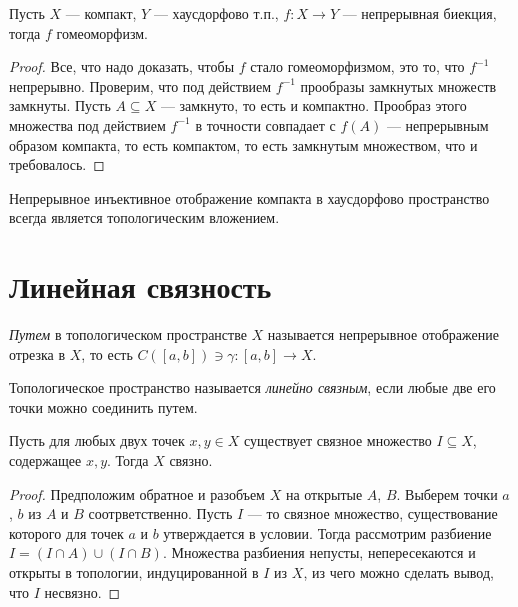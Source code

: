 \begin{theorem}
	Пусть $X$ --- компакт, $Y$ --- хаусдорфово т.п., $f \colon X \to Y$ ---
	непрерывная биекция, тогда $f$ гомеоморфизм.
\end{theorem}
\begin{proof}
	Все, что надо доказать, чтобы $f$ стало гомеоморфизмом, это то, что $f^{-1}$
	непрерывно. Проверим, что под действием $f^{-1}$ прообразы замкнутых множеств
	замкнуты. Пусть $A \subseteq X$ --- замкнуто, то есть и компактно. Прообраз
	этого множества под действием $f^{-1}$ в точности совпадает с $f(A)$ ---
	непрерывным образом компакта, то есть компактом, то есть замкнутым множеством,
	что и требовалось. 
\end{proof}

\begin{corollary}
	Непрерывное инъективное отображение компакта в хаусдорфово пространство
	всегда является топологическим вложением.
\end{corollary}

\section{Линейная связность}

\begin{definition}
	\textit{Путем} в топологическом пространстве $X$ называется непрерывное
	отображение отрезка в $X$, то есть $C([a, b]) \ni \gamma \colon [a, b] \to X$.
\end{definition}

\begin{definition}
	Топологическое пространство называется \textit{линейно связным},
	если любые две его точки можно соединить путем.
\end{definition}

\begin{lemma}
	Пусть для любых двух точек $x, y \in X$ существует связное множество
	$I \subseteq X$, содержащее $x, y$. Тогда $X$ связно.
\end{lemma}
\begin{proof}
	Предположим обратное и разобъем $X$ на открытые $A$, $B$. Выберем
	точки $a$, $b$ из $A$ и $B$ соотрветственно. Пусть $I$ --- то связное множество,
	существование которого для точек $a$ и $b$ утверждается в условии.
	Тогда рассмотрим разбиение $I = (I \cap A) \cup (I \cap B)$. Множества
	разбиения непусты, непересекаются и открыты в топологии, индуцированной в
	$I$ из $X$, из чего можно сделать вывод, что $I$ несвязно.
\end{proof}

